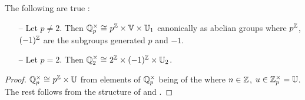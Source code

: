 \begin{prop}

  The following are true : 
  \begin{itemize}
    \item[--] Let $p \neq 2$. 
    Then $\mathbb{Q}_p^\times \cong_{} p^{\mathbb{Z}} \times \mathbb{V} \times \mathbb{U}_1$ 
    canonically as abelian groups
    where $p^{\mathbb{Z}}$, $(-1)^{\mathbb{Z}}$ are the subgroups generated $p$ and $-1$. 
    \item[--] Let $p = 2$.
    Then $\mathbb{Q}_2^\times \cong_{} 2^{\mathbb{Z}} \times (-1)^{\mathbb{Z}} \times \mathbb{U}_2$.
  \end{itemize}
\end{prop}
\begin{proof}
  $\mathbb{Q}_p^\times \cong_{} p^{\mathbb{Z}} \times \mathbb{U}$ from 
  elements of $\mathbb{Q}_p^\times$ being of the
   where 
  $n \in \mathbb{Z}$, $u \in \mathbb{Z}_p^\times = \mathbb{U}$.
  The rest follows from the structure of 
   and .
\end{proof}


